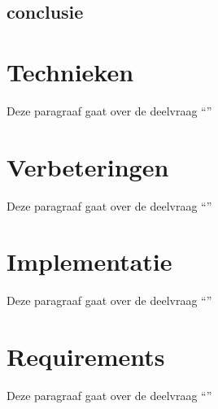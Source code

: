 \subsection{conclusie}

\section{Technieken}
Deze paragraaf gaat over de deelvraag \enquote{\deeltechnieken}

\section{Verbeteringen}
Deze paragraaf gaat over de deelvraag \enquote{\deelverbetering}


\section{Implementatie}
Deze paragraaf gaat over de deelvraag \enquote{\deelimplementatie}


\section{Requirements}
Deze paragraaf gaat over de deelvraag \enquote{\deelrequirements}